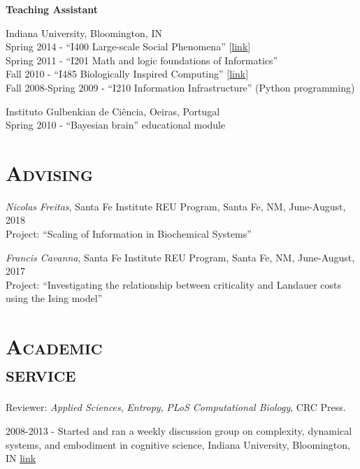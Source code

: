 \documentclass[margin,line,centered]{res}
\begin{document}
\begin{resume}
\textbf{Teaching Assistant}

Indiana University, Bloomington, IN\\
\hangindent=10pt Spring 2014 - ``I400 Large-scale Social Phenomena'' {[}\href{http://tuvalu.santafe.edu/~simon/page11/page11.html}{link}{]} \\
Spring 2011 - ``I201 Math and logic foundations of Informatics''\\
Fall 2010 - ``I485 Biologically Inspired Computing'' {[}\href{http://www.informatics.indiana.edu/rocha/i-bic/}{link}{]}\\
Fall 2008-Spring 2009 - ``I210 Information Infrastructure'' (Python programming)

Instituto Gulbenkian de Ciência, Oeiras, Portugal\\
\hangindent=10pt Spring 2010 - ``Bayesian brain'' educational module


\section{\textsc{Advising}}
\emph{Nicolas Freitas}, Santa Fe Institute REU Program, Santa Fe, NM, June-August, 2018 \\
Project: ``Scaling of Information in Biochemical Systems''

\emph{Francis Cavanna}, Santa Fe Institute REU Program, Santa Fe, NM, June-August, 2017 \\
Project: ``Investigating the relationship between criticality and Landauer costs using the Ising model''

\section{\textsc{Academic\\service}}

{Reviewer}: \emph{Applied Sciences}, \emph{Entropy}, \emph{PLoS Computational Biology}, CRC Press.

2008-2013 - Started and ran a weekly discussion group on complexity, dynamical systems, and embodiment in cognitive science, Indiana University, Bloomington, IN \href{http://apophenia.wikidot.com/}{link}


\end{resume}
\end{document}
